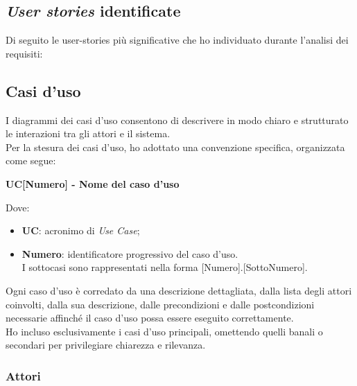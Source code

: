 \pagebreak
\subsection*{\textit{User stories} identificate}

Di seguito le \gls{user-stories} più significative che ho individuato durante l'analisi dei requisiti:
\label{subsubsec:epic-stories}



\subsection{Casi d'uso}
\label{subsec:casi-duso}

I diagrammi dei casi d’uso consentono di descrivere in modo chiaro e strutturato le interazioni tra gli attori e il sistema.\\

\noindent Per la stesura dei casi d’uso, ho adottato una convenzione specifica, organizzata come segue:

\begin{center}
\textbf{UC[Numero] - Nome del caso d’uso}
\end{center}

Dove:
\begin{itemize}
    \item \textbf{UC}: acronimo di \textit{Use Case};
    \item \textbf{Numero}: identificatore progressivo del caso d’uso.\\
    I sottocasi sono rappresentati nella forma [Numero].[SottoNumero].
\end{itemize}

\noindent Ogni caso d’uso è corredato da una descrizione dettagliata, dalla lista degli attori coinvolti, dalla sua descrizione, dalle precondizioni e dalle postcondizioni necessarie affinché il caso d’uso possa essere eseguito correttamente.\\

\noindent Ho incluso esclusivamente i casi d’uso principali, omettendo quelli banali o secondari per privilegiare chiarezza e rilevanza.\\

\subsubsection{Attori}
\label{subsubsec:attori}

